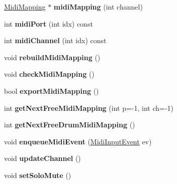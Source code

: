 \begin{DoxyCompactItemize}
\hyperlink{struct_ms_1_1_midi_mapping}{Midi\+Mapping} $\ast$ {\bfseries midi\+Mapping} (int channel)
\item 
\mbox{\label{class_ms_1_1_master_score_ab05f4e0efea275f0d7285ddf040dec8d}} 
int {\bfseries midi\+Port} (int idx) const
\item 
\mbox{\label{class_ms_1_1_master_score_a1397dba3cf7d05d4cd833c2341fa1cea}} 
int {\bfseries midi\+Channel} (int idx) const
\item 
\mbox{\label{class_ms_1_1_master_score_af8411000a9edcc95127359d6858ca24b}} 
void {\bfseries rebuild\+Midi\+Mapping} ()
\item 
\mbox{\label{class_ms_1_1_master_score_a44c80f41c702b125f7e6bb30faf384d9}} 
void {\bfseries check\+Midi\+Mapping} ()
\item 
\mbox{\label{class_ms_1_1_master_score_a6d74f3672cd37389ddfcefc3148a6427}} 
bool {\bfseries export\+Midi\+Mapping} ()
\item 
\mbox{\label{class_ms_1_1_master_score_ab1f1f12b22490065714a4e768cce3d39}} 
int {\bfseries get\+Next\+Free\+Midi\+Mapping} (int p=-\/1, int ch=-\/1)
\item 
\mbox{\label{class_ms_1_1_master_score_a35eb91c2054a6e0ada1889644f7f02e3}} 
int {\bfseries get\+Next\+Free\+Drum\+Midi\+Mapping} ()
\item 
\mbox{\label{class_ms_1_1_master_score_a9a10fad37d077d1f63abd0bb4c18d8aa}} 
void {\bfseries enqueue\+Midi\+Event} (\hyperlink{struct_ms_1_1_midi_input_event}{Midi\+Input\+Event} ev)
\item 
\mbox{\label{class_ms_1_1_master_score_a88788bcb819de0444868a3327acb8adc}} 
void {\bfseries update\+Channel} ()
\item 
\mbox{\label{class_ms_1_1_master_score_abeef1132ca7f8106832876e7946ee57b}} 
void {\bfseries set\+Solo\+Mute} ()
\item 

\end{DoxyCompactItemize}

